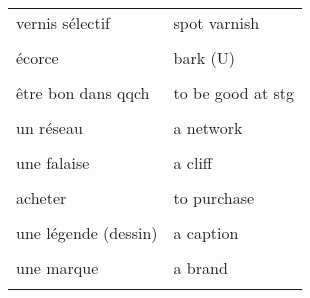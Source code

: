 \documentclass[
  10pt,
]{article}
\begin{document}
\begin{longtable}{ll}
vernis sélectif & spot varnish\\

\cellcolor{gray!6}{vif (couleur)} & \cellcolor{gray!6}{bright}\\

écorce & bark (U)\\

\cellcolor{gray!6}{épaisseur} & \cellcolor{gray!6}{thickness}\\

être bon dans qqch & to be good  at stg\\

\cellcolor{gray!6}{un propriétaire} & \cellcolor{gray!6}{an owner}\\

un réseau & a network\\

\cellcolor{gray!6}{difficile} & \cellcolor{gray!6}{tough}\\

une falaise & a cliff\\

\cellcolor{gray!6}{une vente} & \cellcolor{gray!6}{a sale}\\

acheter & to purchase\\

\cellcolor{gray!6}{améliorer, mettre en valeur} & \cellcolor{gray!6}{to enhance}\\

une légende (dessin) & a caption\\

\cellcolor{gray!6}{jetable} & \cellcolor{gray!6}{disposable}\\

une marque & a brand\\

\cellcolor{gray!6}{un outil} & \cellcolor{gray!6}{a tool}\\
\bottomrule
\end{longtable}

\end{document}
